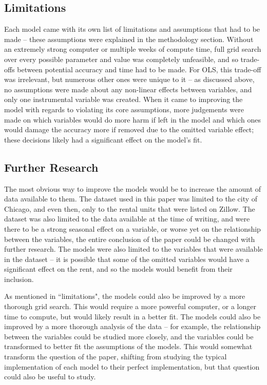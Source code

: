 \documentclass[12pt]{report}
\begin{document}
\subsection{Limitations}
Each model came with its own list of limitations and assumptions that had to be made -- these assumptions were explained in the methodology section. Without an extremely strong computer or multiple weeks of compute time, full grid search over every possible parameter and value was completely unfeasible, and so trade-offs between potential accuracy and time had to be made. For OLS, this trade-off was irrelevant, but numerous other ones were unique to it -- as discussed above, no assumptions were made about any non-linear effects between variables, and only one instrumental variable was created. When it came to improving the model with regards to violating its core assumptions, more judgements were made on which variables would do more harm if left in the model and which ones would damage the accuracy more if removed due to the omitted variable effect; these decisions likely had a significant effect on the model's fit.

\subsection{Further Research}
The most obvious way to improve the models would be to increase the amount of data available to them. The dataset used in this paper was limited to the city of Chicago, and even then, only to the rental units that were listed on Zillow. The dataset was also limited to the data available at the time of writing, and were there to be a strong seasonal effect on a variable, or worse yet on the relationship between the variables, the entire conclusion of the paper could be changed with further research. The models were also limited to the variables that were available in the dataset -- it is possible that some of the omitted variables would have a significant effect on the rent, and so the models would benefit from their inclusion.

As mentioned in ``limitations", the models could also be improved by a more thorough grid search. This would require a more powerful computer, or a longer time to compute, but would likely result in a better fit. The models could also be improved by a more thorough analysis of the data -- for example, the relationship between the variables could be studied more closely, and the variables could be transformed to better fit the assumptions of the models. This would somewhat transform the question of the paper, shifting from studying the typical implementation of each model to their perfect implementation, but that question could also be useful to study.
\end{document}
